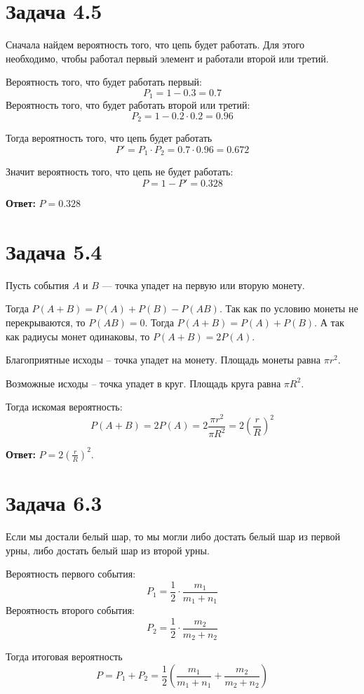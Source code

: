 \documentclass{article}
\begin{document}
\section{Задача 4.5}
Сначала найдем вероятность того, что цепь будет работать.
Для этого необходимо, чтобы работал первый элемент и работали второй или третий.

Вероятность того, что будет работать первый:
\[ P_1 = 1 - 0.3 = 0.7 \]
Вероятность того, что будет работать второй или третий:
\[ P_2 = 1 - 0.2 \cdot 0.2 = 0.96 \]

Тогда вероятность того, что цепь будет работать
\[ P' = P_1 \cdot P_2 = 0.7 \cdot 0.96 = 0.672  \]

Значит вероятность того, что цепь не будет работать:
\[ P = 1 - P' = 0.328 \]

\textbf{Ответ:} \( P = 0.328 \)

\section{Задача 5.4}
Пусть события \(A\) и \(B\) --- точка упадет на первую или вторую монету.

Тогда \(P(A + B) = P(A) + P(B) - P(AB)\).
Так как по условию монеты не перекрываются, то
\(P(AB) = 0\).
Тогда \(P(A+B) = P(A) + P(B)\).
А так как радиусы монет одинаковы, то
\(P(A+B) = 2 P(A)\).

Благоприятные исходы -- точка упадет на монету.
Площадь монеты равна \(\pi r^2\).

Возможные исходы -- точка упадет в круг.
Площадь круга равна \( \pi R^2 \).

Тогда искомая вероятность:
\[ P(A + B) = 2 P (A) = 2 \frac{\pi r^2}{\pi R^2} = 2 \left(\frac{r}{R}\right)^2 \]

\textbf{Ответ:} \(P = 2 \left( \frac{r}{R} \right)^2 \).

\section{Задача 6.3}
Если мы достали белый шар, то мы могли
либо достать белый шар из первой урны,
либо достать белый шар из второй урны.

Вероятность первого события:
\[ P_1 = \frac{1}{2} \cdot \frac{m_1}{m_1 + n_1} \]
Вероятность второго события:
\[ P_2 = \frac{1}{2} \cdot \frac{m_2}{m_2 + n_2} \]

Тогда итоговая вероятность
\[ P = P_1 + P_2 = \frac{1}{2} \left( \frac{m_1}{m_1 + n_1} + \frac{m_2}{m_2 + n_2} \right) \]
\end{document}
